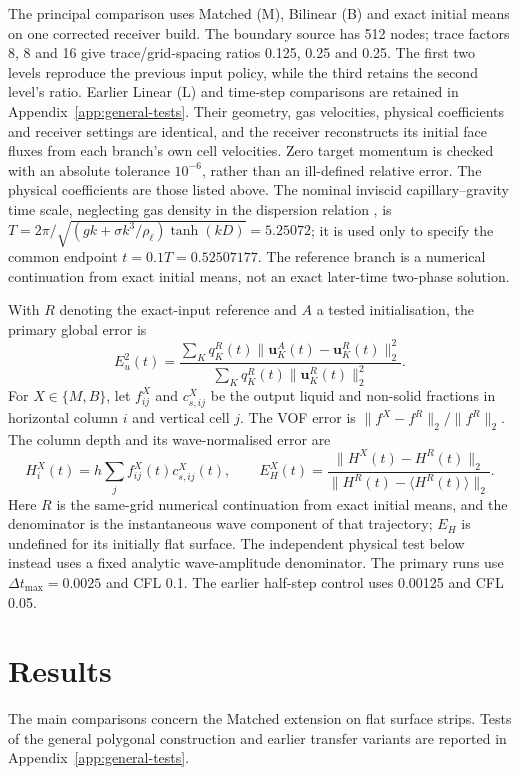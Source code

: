 \documentclass[10pt]{article}
\begin{document}
The principal comparison uses Matched (M), Bilinear (B) and exact initial
means on one corrected receiver build. The boundary source has 512 nodes;
trace factors 8, 8 and 16 give trace/grid-spacing ratios 0.125, 0.25 and
0.25. The first two levels reproduce the previous input policy, while the
third retains the second level's ratio. Earlier Linear (L) and time-step
comparisons are retained in Appendix~\ref{app:general-tests}.
Their geometry, gas velocities, physical coefficients and receiver settings
are identical, and the receiver reconstructs its initial face fluxes from
each branch's own cell velocities. Zero target momentum is checked with an
absolute tolerance $10^{-6}$, rather than an ill-defined relative error.
The physical coefficients are those listed above. The nominal inviscid
capillary--gravity time scale, neglecting gas density in the dispersion
relation \citep{fitzpatrick}, is
$T=2\pi/\sqrt{(gk+\sigma k^3/\rho_\ell)\tanh(kD)}=5.25072$;
it is used only to specify the common endpoint $t=0.1T=0.52507177$.
The reference branch is a numerical continuation from exact initial means,
not an exact later-time two-phase solution.

With $R$ denoting the exact-input reference and $A$ a tested initialisation,
the primary global error is
\begin{equation}
 E_u^2(t)=\frac{\sum_Kq_K^R(t)\|\boldsymbol u_K^A(t)-\boldsymbol u_K^R(t)\|_2^2}
                    {\sum_Kq_K^R(t)\|\boldsymbol u_K^R(t)\|_2^2}.
 \label{eq:dynamic-error}
\end{equation}
For $X\in\{M,B\}$, let $f_{ij}^X$ and $c_{s,ij}^X$ be the output liquid
and non-solid fractions in horizontal column $i$ and vertical cell $j$.
The VOF error is $\|f^X-f^R\|_2/\|f^R\|_2$. The column depth and its
wave-normalised error are
\begin{equation}
 H_i^X(t)=h\sum_j f_{ij}^X(t)c_{s,ij}^X(t),\qquad
 E_H^X(t)=\frac{\|H^X(t)-H^R(t)\|_2}
 {\|H^R(t)-\langle H^R(t)\rangle\|_2}.
 \label{eq:dynamic-depth-error}
\end{equation}
Here $R$ is the same-grid numerical continuation from exact initial means,
and the denominator is the instantaneous wave component of that trajectory;
$E_H$ is undefined for its initially flat surface. The independent physical
test below instead uses a fixed analytic wave-amplitude denominator. The
primary runs use $\Delta t_{\max}=0.0025$ and
CFL 0.1. The earlier half-step control uses 0.00125 and CFL 0.05.

\section{Results}
The main comparisons concern the Matched extension on flat surface strips.
Tests of the general polygonal construction and earlier transfer
variants are reported in Appendix~\ref{app:general-tests}.
\end{document}
